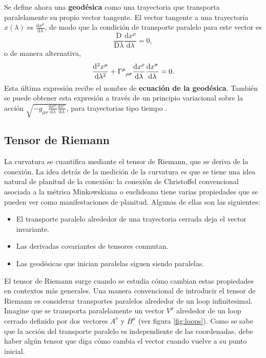 Se define ahora una \textbf{geodésica} como una trayectoria que transporta paralelamente su propio vector tangente. El vector tangente a una trayectoria $x(\lambda)$ es $\frac{\mathrm{d}x^\mu}{\mathrm{d}\lambda}$, de modo que la condición de transporte paralelo para este vector es
\begin{equation}
\frac{\mathrm{D}}{\mathrm{D}\lambda}\frac{\mathrm{d}x^\mu}{\mathrm{d}\lambda}=0,
\end{equation}
o de manera alternativa,
\begin{equation}\label{geodesicEquation}
	\frac{\mathrm{d}^2x^\mu}{\mathrm{d}\lambda^2}+\Gamma\indices{^\mu_{\rho\sigma}}\frac{\mathrm{d}x^\rho}{\mathrm{d}\lambda}\frac{\mathrm{d}x^\sigma}{\mathrm{d}\lambda}=0.
\end{equation}
Esta última expresión recibe el nombre de \textbf{ecuación de la geodésica}. También se puede obtener esta expresión a través de un principio variacional sobre la acción $\sqrt{-g_{\mu\nu}\frac{\mathrm{d}x^\mu}{\mathrm{d}\lambda}\frac{\mathrm{d}x^\nu}{\mathrm{d}\lambda}}$, para trayectorias tipo tiempo \cite{Carroll}.

\subsection{Tensor de Riemann}
La curvatura se cuantifica mediante el tensor de Riemann, que se deriva de la conexión. La idea detrás de la medición de la curvatura es que se tiene una idea natural de planitud de la conexión: la conexión de Christoffel convencional asociada a la métrica Minkowskiana o euclideana tiene varias propiedades que se pueden ver como manifestaciones de planitud. Algunas de ellas son las siguientes:
\begin{itemize}
	\item El transporte paralelo alrededor de una trayectoria cerrada deja el vector invariante.
	\item Las derivadas covariantes de tensores conmutan.
	\item Las geodésicas que inician paralelas siguen siendo paralelas.
\end{itemize}
El tensor de Riemann surge cuando se estudia cómo cambian estas propiedades en contextos más generales. Una manera convencional de introducir el tensor de Riemann es considerar transportes paralelos alrededor de un loop infinitesimal. Imagine que se transporta paralelamente un vector $V^\sigma$ alrededor de un loop cerrado definido por dos vectores $A^\nu$ y $B^\mu$ (ver figura \ref{fig:loops}). Como se sabe que la acción del transporte paralelo es independiente de las coordenadas, debe haber algún tensor que diga cómo cambia el vector cuando vuelve a su punto inicial.

